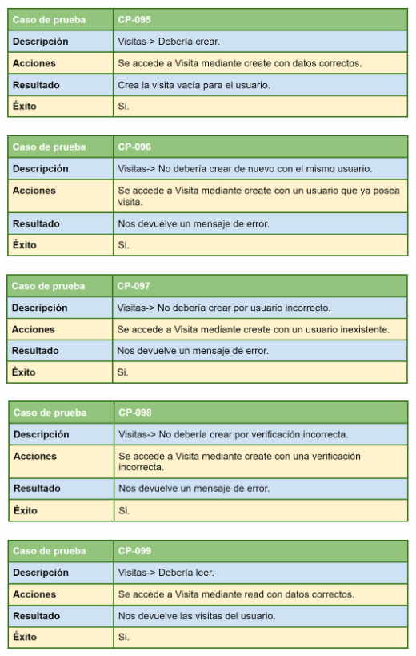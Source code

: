 \bigskip

\includegraphics[width=\textwidth]{img/cap7/cp-095.png}

\bigskip

\includegraphics[width=\textwidth]{img/cap7/cp-096.png}

\bigskip

\includegraphics[width=\textwidth]{img/cap7/cp-097.png}

\bigskip

\includegraphics[width=\textwidth]{img/cap7/cp-098.png}

\bigskip

\includegraphics[width=\textwidth]{img/cap7/cp-099.png}

